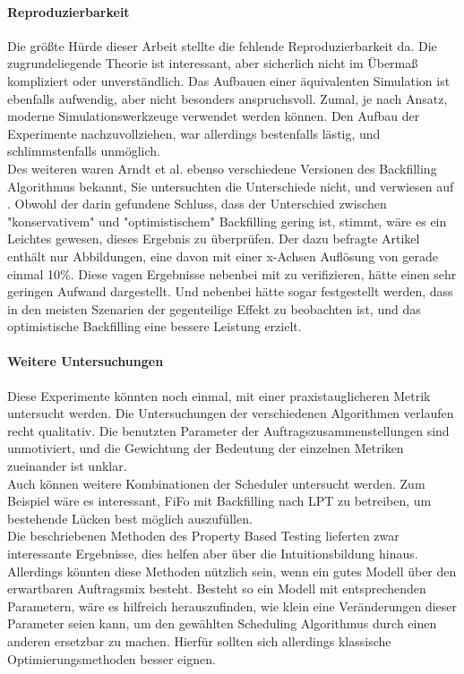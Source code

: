 \paragraph{Reproduzierbarkeit}
Die größte Hürde dieser Arbeit stellte die fehlende Reproduzierbarkeit da. Die zugrundeliegende Theorie ist interessant, aber sicherlich nicht im Übermaß kompliziert oder unverständlich. Das Aufbauen einer äquivalenten Simulation ist ebenfalls aufwendig, aber nicht besonders anspruchsvoll. Zumal, je nach Ansatz, moderne Simulationswerkzeuge verwendet werden können.
Den Aufbau der Experimente nachzuvollziehen, war allerdings bestenfalls lästig, und schlimmstenfalls unmöglich. \\
Des weiteren waren Arndt et al. ebenso verschiedene Versionen des Backfilling Algorithmus bekannt, Sie untersuchten die Unterschiede nicht, und verwiesen auf \cite{optVsCons}. Obwohl der darin gefundene Schluss, dass der Unterschied zwischen "konservativem" und "optimistischem" Backfilling gering ist, stimmt, wäre es ein Leichtes gewesen, dieses Ergebnis zu überprüfen. Der dazu befragte Artikel enthält nur Abbildungen, eine davon mit einer x-Achsen Auflösung von gerade einmal 10\%. Diese vagen Ergebnisse nebenbei mit zu verifizieren, hätte einen sehr geringen Aufwand dargestellt. Und nebenbei hätte sogar festgestellt werden, dass in den meisten Szenarien der gegenteilige Effekt zu beobachten ist, und das optimistische Backfilling eine bessere Leistung erzielt.

\paragraph{Weitere Untersuchungen}
Diese Experimente könnten noch einmal, mit einer praxistauglicheren Metrik untersucht werden. Die Untersuchungen der verschiedenen Algorithmen verlaufen recht qualitativ. Die benutzten Parameter der Auftragszusammenstellungen sind unmotiviert, und die Gewichtung der Bedeutung der einzelnen Metriken zueinander ist unklar.\\
Auch können weitere Kombinationen der Scheduler untersucht werden. Zum Beispiel wäre es interessant, FiFo mit Backfilling nach LPT zu betreiben, um bestehende Lücken best möglich auszufüllen.\\
Die beschriebenen Methoden des Property Based Testing lieferten zwar interessante Ergebnisse, dies helfen aber über die Intuitionsbildung hinaus. Allerdings könnten diese Methoden nützlich sein, wenn ein gutes Modell über den erwartbaren Auftragsmix besteht. Besteht so ein Modell mit entsprechenden Parametern, wäre es hilfreich herauszufinden, wie klein eine Veränderungen dieser Parameter seien kann, um den gewählten Scheduling Algorithmus durch einen anderen ersetzbar zu machen. Hierfür sollten sich allerdings klassische Optimierungsmethoden besser eignen. 